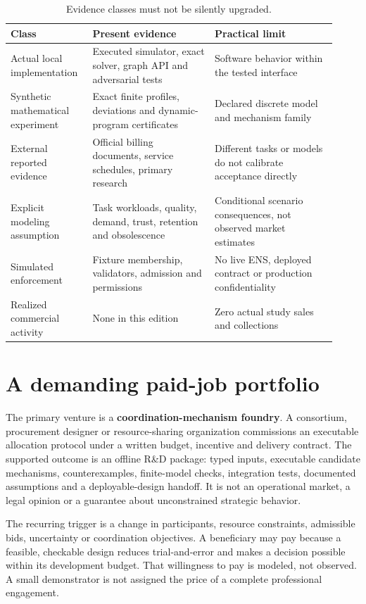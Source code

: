 \documentclass[11pt,letterpaper]{article}
\begin{document}
\begin{table}[H]\centering\small
\caption{Evidence classes must not be silently upgraded.}\label{tab:evidence}
\begin{tabular}{p{0.22\linewidth}p{0.35\linewidth}p{0.35\linewidth}}\toprule
Class & Present evidence & Practical limit\\\midrule
Actual local implementation & Executed simulator, exact solver, graph API and adversarial tests & Software behavior within the tested interface\\
Synthetic mathematical experiment & Exact finite profiles, deviations and dynamic-program certificates & Declared discrete model and mechanism family\\
External reported evidence & Official billing documents, service schedules, primary research & Different tasks or models do not calibrate acceptance directly\\
Explicit modeling assumption & Task workloads, quality, demand, trust, retention and obsolescence & Conditional scenario consequences, not observed market estimates\\
Simulated enforcement & Fixture membership, validators, admission and permissions & No live ENS, deployed contract or production confidentiality\\
Realized commercial activity & None in this edition & Zero actual study sales and collections\\\bottomrule
\end{tabular}
\end{table}

\section{A demanding paid-job portfolio}

The primary venture is a \textbf{coordination-mechanism foundry}. A consortium,
procurement designer or resource-sharing organization commissions an executable
allocation protocol under a written budget, incentive and delivery contract.
The supported outcome is an offline R\&D package: typed inputs, executable
candidate mechanisms, counterexamples, finite-model checks, integration tests,
documented assumptions and a deployable-design handoff. It is not an operational
market, a legal opinion or a guarantee about unconstrained strategic behavior.

The recurring trigger is a change in participants, resource constraints,
admissible bids, uncertainty or coordination objectives. A beneficiary may pay
because a feasible, checkable design reduces trial-and-error and makes a decision
possible within its development budget. That willingness to pay is modeled,
not observed. A small demonstrator is not assigned the price of a complete
professional engagement.
\end{document}
